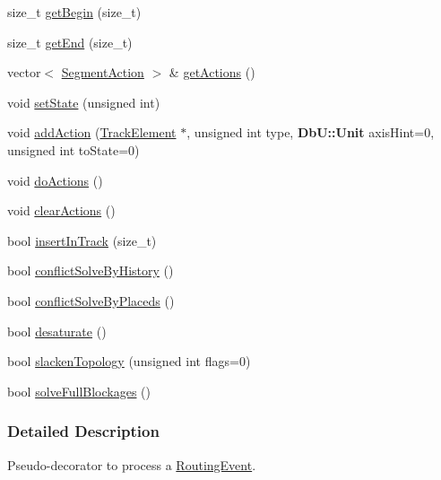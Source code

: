 \begin{DoxyCompactItemize}
\item 
size\+\_\+t \mbox{\hyperlink{classKite_1_1SegmentFsm_a13a1ec8bdcf29f2bcb21cab348b77ed2}{get\+Begin}} (size\+\_\+t)
\item 
size\+\_\+t \mbox{\hyperlink{classKite_1_1SegmentFsm_aaf31c0a3018908a2ee26a8ea9e893eb1}{get\+End}} (size\+\_\+t)
\item 
vector$<$ \mbox{\hyperlink{classKite_1_1SegmentAction}{Segment\+Action}} $>$ \& \mbox{\hyperlink{classKite_1_1SegmentFsm_ab3b06bb353ee9333be6b937bffc8fd84}{get\+Actions}} ()
\item 
void \mbox{\hyperlink{classKite_1_1SegmentFsm_adf5147448951f8dc8b4088a1032e97b2}{set\+State}} (unsigned int)
\item 
void \mbox{\hyperlink{classKite_1_1SegmentFsm_ad9384c1cc2a9cd70ab9ff089b56380a0}{add\+Action}} (\mbox{\hyperlink{classKite_1_1TrackElement}{Track\+Element}} $\ast$, unsigned int type, \textbf{ Db\+U\+::\+Unit} axis\+Hint=0, unsigned int to\+State=0)
\item 
void \mbox{\hyperlink{classKite_1_1SegmentFsm_abbcf429498049478d4d8ab94cdb4a022}{do\+Actions}} ()
\item 
void \mbox{\hyperlink{classKite_1_1SegmentFsm_a4cf911f1f4e5ac588d502c9d069a1bde}{clear\+Actions}} ()
\item 
bool \mbox{\hyperlink{classKite_1_1SegmentFsm_a7140b507da2cab137d968a037bed19df}{insert\+In\+Track}} (size\+\_\+t)
\item 
bool \mbox{\hyperlink{classKite_1_1SegmentFsm_a0d9a9926ae67cc7998799347f135e28a}{conflict\+Solve\+By\+History}} ()
\item 
bool \mbox{\hyperlink{classKite_1_1SegmentFsm_a9c0fa6a9067b6e027e24f38330f627dc}{conflict\+Solve\+By\+Placeds}} ()
\item 
bool \mbox{\hyperlink{classKite_1_1SegmentFsm_a0b8e8be9d7c9501be9534d3c2a9dd586}{desaturate}} ()
\item 
bool \mbox{\hyperlink{classKite_1_1SegmentFsm_a623d68f599c0de60cdd36af3f183e6f1}{slacken\+Topology}} (unsigned int flags=0)
\item 
bool \mbox{\hyperlink{classKite_1_1SegmentFsm_ab8ae818baad1d0a274a7e8c308ca3f92}{solve\+Full\+Blockages}} ()
\end{DoxyCompactItemize}


\subsubsection{Detailed Description}
Pseudo-\/decorator to process a \mbox{\hyperlink{classKite_1_1RoutingEvent}{Routing\+Event}}. 

